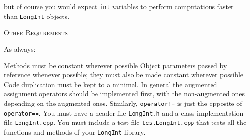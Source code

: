 but of course you would expect \verb!int! variables to perform computations
faster than \verb!LongInt! objects.

\textsc{Other Requirements}

As always:
\begin{tightlist}
    \li Methods must be constant wherever possible \li Object parameters passed
    by reference whenever possible; they must also be made constant wherever
    possible \li Code duplication must be kept to a minimal. In general the
    augmented assignment operators should be implemented first, with the
    non-augmented ones depending on the augmented ones.  Similarly,
    \texttt{operator!=} is just the opposite of \verb!operator==!.  \li You
    must have a header file \verb!LongInt.h! and a class implementation file
    \verb!LongInt.cpp!.  \li You must include a test file
    \verb!testLongInt.cpp! that tests all the functions and methods of your
    \verb!LongInt! library.
\end{tightlist}
